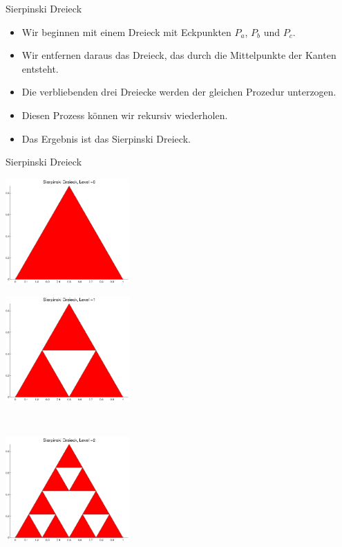 \documentclass[hyperref={xetex}]{beamer}
\begin{document}
%
% 
\begin{frame}[fragile]{Sierpinski Dreieck}
\begin{itemize}
\item Wir beginnen mit einem Dreieck mit Eckpunkten $P_a$, $P_b$ und $P_c$. 
\item Wir entfernen daraus das Dreieck, das durch die Mittelpunkte der
  Kanten entsteht.
\item Die verbliebenden drei Dreiecke werden der gleichen Prozedur
  unterzogen.
\item Diesen Prozess können wir rekursiv wiederholen.
\item Das Ergebnis ist das Sierpinski Dreieck.
\end{itemize}
\end{frame}
%
% 
\begin{frame}[fragile]{Sierpinski Dreieck}
\begin{minipage}{5cm}
\includegraphics[height=4cm]{figures/sierpinski_0}
\end{minipage} \hfill
\begin{minipage}{5cm}
\includegraphics[height=4cm]{figures/sierpinski_1}
\end{minipage}\\ 
\begin{minipage}{5cm}
\includegraphics[height=4cm]{figures/sierpinski_2}

\end{minipage}
\end{frame}
\end{document}

